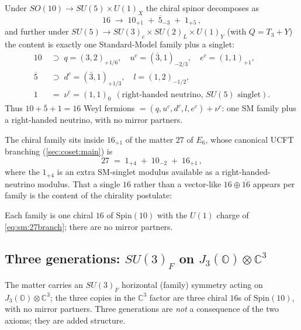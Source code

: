 \begin{theorem}[$16$ = one SM family $+$ $\nu^c$]\label{thm:sm:family}
Under $SO(10)\to SU(5)\times U(1)_X$ the chiral spinor decomposes as
\begin{equation}\label{eq:sm:16branch}
16 \;\longrightarrow\; 10_{+1}\;+\;\overline{5}_{-3}\;+\;1_{+5}\,,
\end{equation}
and further under $SU(5)\to SU(3)_c\times SU(2)_L\times U(1)_Y$ (with $Q=T_3+Y$) the
content is exactly one Standard-Model family plus a singlet:
\begin{equation}\label{eq:sm:family}
\begin{aligned}
10 &\;\supset\; q=(3,2)_{+1/6},\quad u^c=(\bar3,1)_{-2/3},\quad e^c=(1,1)_{+1},\\
\overline{5} &\;\supset\; d^c=(\bar3,1)_{+1/3},\quad l=(1,2)_{-1/2},\\
1 &\;=\; \nu^c=(1,1)_{0}\ \ (\text{right-handed neutrino, $SU(5)$ singlet}).
\end{aligned}
\end{equation}
Thus $10+\overline{5}+1=16$ Weyl fermions $=(q,u^c,d^c,l,e^c)+\nu^c$: one SM family
plus a right-handed neutrino, with no mirror partners.
\end{theorem}

The chiral family sits inside $16_{+1}$ of the matter $27$ of $E_6$, whose canonical
UCFT branching (\autoref{sec:coset:main}) is
\begin{equation}\label{eq:sm:27branch}
27 \;=\; 1_{+4}\;+\;10_{-2}\;+\;16_{+1}\,,
\end{equation}
where the $1_{+4}$ is an extra SM-singlet modulus available as a right-handed-neutrino
modulus. That a single $16$ rather than a vector-like $16\oplus\overline{16}$ appears
per family is the content of the chirality postulate:

\begin{postulate}\label{post:sm:P4}
Each family is one chiral $16$ of $\mathrm{Spin}(10)$ with the $U(1)$ charge of
\eqref{eq:sm:27branch}; there are no mirror partners.
\end{postulate}

\subsection{Three generations: \texorpdfstring{$SU(3)_F$}{SU(3)F} on
\texorpdfstring{$J_3(\mathbb{O})\otimes\mathbb{C}^3$}{J3(O)xC3}}
\label{sec:sm:generations}

\begin{postulate}\label{post:sm:P5}
The matter carries an $SU(3)_F$ horizontal (family) symmetry acting on
$J_3(\mathbb{O})\otimes\mathbb{C}^3$; the three copies in the $\mathbb{C}^3$ factor are
three chiral $16$s of $\mathrm{Spin}(10)$, with no mirror partners. Three generations
are \emph{not} a consequence of the two axioms; they are added structure.
\end{postulate}

